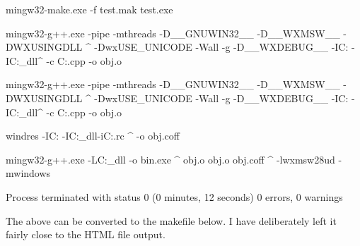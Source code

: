\begin{code}

mingw32-make.exe -f test.mak test.exe

mingw32-g++.exe -pipe -mthreads -D__GNUWIN32__ -D__WXMSW__ -DWXUSINGDLL         ^
    -DwxUSE_UNICODE -Wall -g -D__WXDEBUG__ -IC:\PF{}
    -IC:\PF{}\contrib\PF{}\lib\gcc_dll\mswud ^ 
    -c C:\Development\test\testApp.cpp -o obj\Debug\testApp.o

mingw32-g++.exe -pipe -mthreads -D__GNUWIN32__ -D__WXMSW__ -DWXUSINGDLL         ^
    -DwxUSE_UNICODE -Wall -g -D__WXDEBUG__ -IC:\PF{}
    -IC:\PF{}\contrib\PF{}\lib\gcc_dll\mswud ^ 
    -c C:\Development\test\testMain.cpp -o obj\Debug\testMain.o

windres -IC:\PF{}\PF{}\contrib
    -IC:\PF{}\lib\gcc_dll\mswud -iC:\Development\test\resource.rc    ^ 
    -o obj\Debug\resource.coff

mingw32-g++.exe -LC:\PF{}\lib\gcc_dll -o bin\Debug\test.exe          ^
    obj\Debug\testApp.o obj\Debug\testMain.o obj\Debug\resource.coff            ^
    -lwxmsw28ud -mwindows

Process terminated with status 0 (0 minutes, 12 seconds)
0 errors, 0 warnings
\end{code}

The above can be converted to the makefile below. I have deliberately left it fairly close to the HTML file output.

